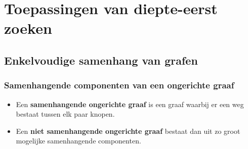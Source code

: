 \chapter{Toepassingen van diepte-eerst zoeken}
\section{Enkelvoudige samenhang van grafen}
\subsection{Samenhangende componenten van een ongerichte graaf}
\begin{itemize}
	\item Een \textbf{samenhangende ongerichte graaf} is een graaf waarbij er een weg bestaat tussen elk paar knopen.
	\item Een \textbf{niet samenhangende ongerichte graaf} bestaat dan uit zo groot mogelijke samenhangende componenten.
\end{itemize}

